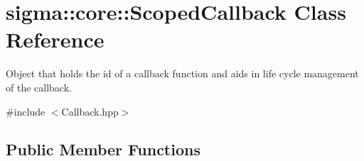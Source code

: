 \hypertarget{classsigma_1_1core_1_1_scoped_callback}{\section{sigma\-:\-:core\-:\-:Scoped\-Callback Class Reference}
\label{classsigma_1_1core_1_1_scoped_callback}
}


Object that holds the id of a callback function and aids in life cycle management of the callback.  




{\ttfamily \#include $<$Callback.\-hpp$>$}

\subsection*{Public Member Functions}
